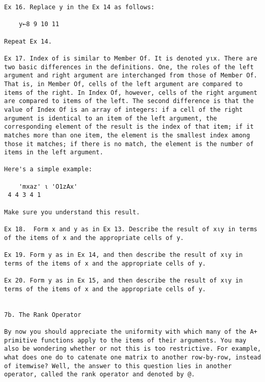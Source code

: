 \documentclass{article}
\begin{document}
\begin{verbatim}
Ex 16. Replace y in the Ex 14 as follows:                             

	y←8 9 10 11                                                          

Repeat Ex 14.                                                         

Ex 17. Index of is similar to Member Of. It is denoted y⍳x. There are 
two basic differences in the definitions. One, the roles of the left  
argument and right argument are interchanged from those of Member Of. 
That is, in Member Of, cells of the left argument are compared to     
items of the right. In Index Of, however, cells of the right argument 
are compared to items of the left. The second difference is that the  
value of Index Of is an array of integers: if a cell of the right     
argument is identical to an item of the left argument, the            
corresponding element of the result is the index of that item; if it  
matches more than one item, the element is the smallest index among   
those it matches; if there is no match, the element is the number of  
items in the left argument.                                           

Here's a simple example:                                              

	'mxaz' ⍳ 'O1zAx'                                                     
 4 4 3 4 1                                                            

Make sure you understand this result.                                 

Ex 18.  Form x and y as in Ex 13. Describe the result of x⍳y in terms 
of the items of x and the appropriate cells of y.                     

Ex 19. Form y as in Ex 14, and then describe the result of x⍳y in     
terms of the items of x and the appropriate cells of y.               

Ex 20. Form y as in Ex 15, and then describe the result of x⍳y in     
terms of the items of x and the appropriate cells of y.               


7b. The Rank Operator                                                 

By now you should appreciate the uniformity with which many of the A+ 
primitive functions apply to the items of their arguments. You may    
also be wondering whether or not this is too restrictive. For example,
what does one do to catenate one matrix to another row-by-row, instead
of itemwise? Well, the answer to this question lies in another        
operator, called the rank operator and denoted by @.                  


\end{verbatim}
\end{document}
